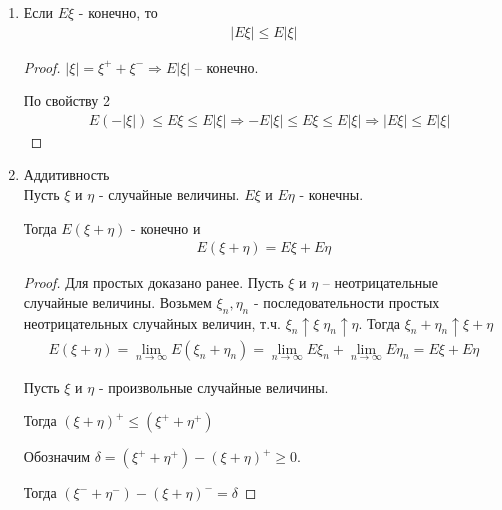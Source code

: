 \begin{enumerate}[label=\protect\circled{\arabic*},series=mean_properties]
\begin{proof}
      Пусть $\xi$ и $\eta$ - произвольные.

      Тогда $\xi^+(\omega) \geq \eta^+(\omega)$ и $\xi^-(\omega) \leq \eta^-(\omega)$

      $\Rightarrow E \eta = E \eta^+ - E \eta^- \leq E \xi^+ - E \xi^- = E \xi$
    \end{proof}

  \item 
    Если $E \xi$ - конечно, то
    \begin{align*}
      |E \xi| \leq E |\xi|
    \end{align*}

    \begin{proof}
      $|\xi| = \xi^+ + \xi^- \Rightarrow E|\xi|$ -- конечно.

      По свойству 2
      \begin{align*}
        &E(-|\xi|) \leq E \xi \leq E |\xi|
        \Rightarrow -E|\xi| \leq E\xi \leq E|\xi| \Rightarrow |E\xi| \leq E|\xi|
      \end{align*}
    \end{proof}

  \item 
    Аддитивность\\
    Пусть $\xi$ и $\eta$ - случайные величины. $E \xi$ и $E \eta$ - конечны.

    Тогда $E (\xi + \eta)$ - конечно и
    \begin{align*}
      E (\xi + \eta) = E \xi + E \eta
    \end{align*}

    \begin{proof}
      Для простых доказано ранее. Пусть $\xi$ и $\eta$ -- неотрицательные случайные величины.
      Возьмем $\xi_n, \eta_n$ - последовательности простых неотрицательных случайных величин, 
      т.ч. $\xi_n \uparrow \xi\;\eta_n \uparrow \eta$. Тогда $\xi_n + \eta_n \uparrow \xi + \eta$
      \begin{align*}
        E (\xi + \eta) = \lim_{n \to \infty} E(\xi_n + \eta_n) = 
        \lim_{n \to \infty} E \xi_n + \lim_{n \to \infty} E \eta_n = E \xi + E \eta
      \end{align*}
     
      Пусть $\xi$ и $\eta$ - произвольные случайные величины.

      Тогда $(\xi + \eta)^+ \leq (\xi^+ + \eta^+)$

      Обозначим $\delta = (\xi^+ + \eta^+) - (\xi + \eta)^+ \geq 0$.

      Тогда $(\xi^- + \eta^-) - (\xi + \eta)^- = \delta$


\end{proof}
\end{enumerate}
